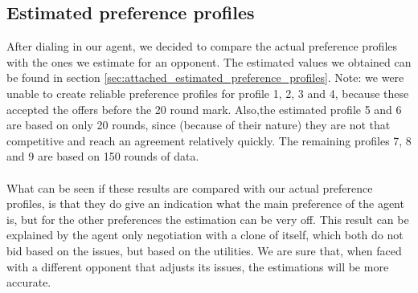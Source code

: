 \subsection{Estimated preference profiles}

After dialing in our agent, we decided to compare the actual preference profiles with the ones we estimate for an opponent.
The estimated values we obtained can be found in section \ref{sec:attached_estimated_preference_profiles}. Note: we were unable to create reliable preference profiles for profile 1, 2, 3 and 4, because these accepted the offers before the 20 round mark. Also,the estimated profile 5 and 6 are based on only 20 rounds, since (because of their nature) they are not that competitive and reach an agreement relatively quickly. The remaining profiles 7, 8 and 9 are based on 150 rounds of data.
\\\\
What can be seen if these results are compared with our actual preference profiles, is that they do give an indication what the main preference of the agent is, but for the other preferences the estimation can be very off. This result can be explained by the agent only negotiation with a clone of itself, which both do not bid based on the issues, but based on the utilities. We are sure that, when faced with a different opponent that adjusts its issues, the estimations will be more accurate.